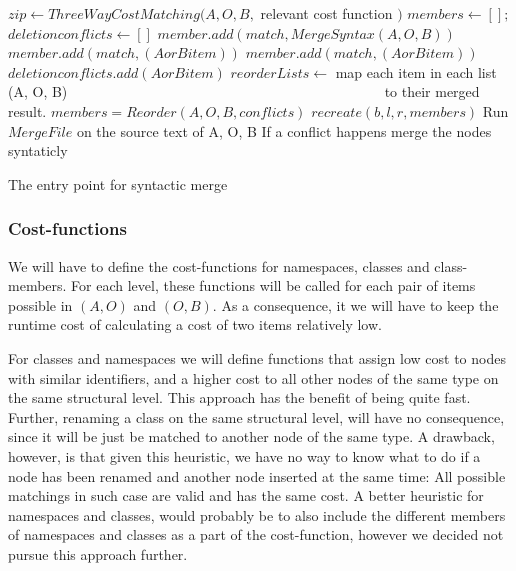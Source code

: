 \documentclass[11pt]{article}
\begin{document}
\begin{algorithm}
\begin{algorithmic}
        \State $zip  \gets ThreeWayCostMatching(A, O, B, $ relevant cost function $)$
        \State $members \gets [];$
        \State $deletionconflicts \gets []$
               \State $member.add(match, MergeSyntax(A, O, B)) $
              \State $member.add(match, (A or B item))$
               \State $member.add(match, (A or B item))$
               \State $deletionconflicts.add(A or B item)$
           \EndIf
           \State $reorderLists \gets $ map each item in each list (A, O, B)
           \State ~~~~~~~~~~~~~~~~~~~~~~~~~~~~~~~~~~~~~~~~~~~~ to their merged result.
           \State $members = Reorder(A, O, B, conflicts)$
       \EndFor
       \State \Return $recreate(b, l, r, members)$
       \State Run $MergeFile$ on the source text of A, O, B
       \State If a conflict happens merge the nodes syntaticly
    \EndIf
\EndFunction
\end{algorithmic}
\caption{The entry point for syntactic merge}
\label{TreeMergeAlgorithm}
\end{algorithm}

\subsubsection{Cost-functions}
We will have to define the cost-functions for namespaces, classes and class-members. For each level, these functions will be called for each pair of items possible in $(A, O)$ and $(O, B)$. As a consequence, it we will have to keep the runtime cost of calculating a cost of two items relatively low.

For classes and namespaces we will define functions that assign low cost to nodes with similar identifiers, and a higher cost to all other nodes of the same type on the same structural level. This approach has the benefit of being quite fast. Further, renaming a class on the same structural level, will have no consequence, since it will be just be matched to another node of the same type. A drawback, however, is that given this heuristic, we have no way to know what to do if a node has been renamed and another node inserted at the same time: All possible matchings in such case are valid and has the same cost. A better heuristic for namespaces and classes, would probably be to also include the different members of namespaces and classes as a part of the cost-function, however we decided not pursue this approach further.
\end{document}
